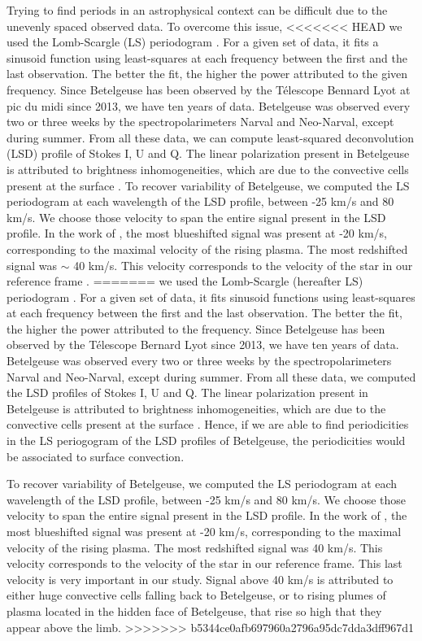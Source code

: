 \documentclass{aa}
\begin{document}
Trying to find periods in an astrophysical context can be difficult due to the unevenly spaced observed data. To overcome this issue, 
<<<<<<< HEAD
we used the Lomb-Scargle (LS) periodogram \citep{Lomb1976,Scargle1982}. For a given set of data, it fits a sinusoid function using 
least-squares at each 
frequency between the first and the last observation. The better the fit, the higher the power attributed to the given frequency. Since 
Betelgeuse has 
been observed by the Télescope Bennard Lyot at pic du midi since 2013, we have ten years of data. Betelgeuse was observed every two or 
three weeks by 
the spectropolarimeters Narval and Neo-Narval, except during summer. From all these data, we can compute least-squared 
deconvolution (LSD) \citep{Donati1997} profile of Stokes I, U and Q. The linear polarization present in Betelgeuse is attributed to 
brightness 
inhomogeneities, which are due to the convective cells present at the surface \citep{LopezAriste2018}. To recover variability of 
Betelgeuse, 
we computed the LS periodogram at each wavelength of the LSD profile, between -25 km/s and 80 km/s. We choose those velocity to span the 
entire 
signal present in the LSD profile. In the work of \cite{LopezAriste2018}, the most blueshifted signal was present at -20 km/s, 
corresponding to the maximal velocity of the rising plasma. The most redshifted signal was $\sim$ 40 km/s. This velocity corresponds 
to the velocity of the star in our reference frame \citep{LopezAriste2018}. 
=======
we used the Lomb-Scargle (hereafter LS) periodogram \citep{lomb_least-squares_1976,scargle_studies_1982}. For a given set of data, it fits sinusoid functions 
using least-squares at each frequency between the first and the last observation. The better the fit, the higher the power attributed to the frequency. 
Since Betelgeuse has been observed by the Télescope Bernard Lyot since 2013, we have ten years of data. Betelgeuse was observed every two or three weeks by 
the spectropolarimeters Narval and Neo-Narval, except during summer. From all these data, we computed the LSD profiles of Stokes I, U and Q. 
The linear polarization present in Betelgeuse is attributed to brightness inhomogeneities, which are due to the convective cells 
present at the surface \citep{lopez_ariste_convective_2018}. Hence, if we are able to find periodicities in the LS periogogram of the LSD profiles of Betelgeuse,
the periodicities would be associated to surface convection. 

To recover variability of Betelgeuse, 
we computed the LS periodogram at each wavelength of the LSD profile, between -25 km/s and 80 km/s. We choose those velocity to span the entire 
signal present in the LSD profile. In the work of \cite{lopez_ariste_convective_2018}, the most blueshifted signal was present at -20 km/s, 
corresponding to the maximal velocity of the rising plasma. The most redshifted signal was 40 km/s. This velocity corresponds 
to the velocity of the star in our reference frame. This last velocity is very important in our study. Signal above 40 km/s is attributed to either huge
convective cells falling back to Betelgeuse, or to rising plumes of plasma located in the hidden face of Betelgeuse,
that rise so high that they appear above the limb.
>>>>>>> b5344ce0afb697960a2796a95dc7dda3dff967d1
\end{document}
